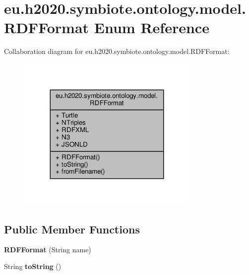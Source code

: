 \hypertarget{enumeu_1_1h2020_1_1symbiote_1_1ontology_1_1model_1_1RDFFormat}{}\section{eu.\+h2020.\+symbiote.\+ontology.\+model.\+R\+D\+F\+Format Enum Reference}
\label{enumeu_1_1h2020_1_1symbiote_1_1ontology_1_1model_1_1RDFFormat}


Collaboration diagram for eu.\+h2020.\+symbiote.\+ontology.\+model.\+R\+D\+F\+Format\+:
\nopagebreak
\begin{figure}[H]
\begin{center}
\leavevmode
\includegraphics[width=251pt]{enumeu_1_1h2020_1_1symbiote_1_1ontology_1_1model_1_1RDFFormat__coll__graph}
\end{center}
\end{figure}
\subsection*{Public Member Functions}
\begin{DoxyCompactItemize}
\item 
{\bfseries R\+D\+F\+Format} (String name)\hypertarget{enumeu_1_1h2020_1_1symbiote_1_1ontology_1_1model_1_1RDFFormat_a6e3856212c9f3a5cb7fbf14f3524ceac}{}\label{enumeu_1_1h2020_1_1symbiote_1_1ontology_1_1model_1_1RDFFormat_a6e3856212c9f3a5cb7fbf14f3524ceac}

\item 
String {\bfseries to\+String} ()\hypertarget{enumeu_1_1h2020_1_1symbiote_1_1ontology_1_1model_1_1RDFFormat_a698b28158da86bc030351d3ce91ab5e5}{}\label{enumeu_1_1h2020_1_1symbiote_1_1ontology_1_1model_1_1RDFFormat_a698b28158da86bc030351d3ce91ab5e5}

\end{DoxyCompactItemize}
